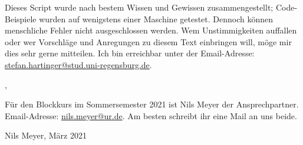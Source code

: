 Dieses Script wurde nach bestem Wissen und Gewissen zusammengestellt; Code-Beispiele wurden auf wenigstens einer Maschine getestet. Dennoch können menschliche Fehler nicht ausgeschlossen werden. Wem Unstimmigkeiten auffallen oder wer Vorschläge und Anregungen zu diesem Text einbringen will, möge mir dies sehr gerne mitteilen. Ich bin erreichbar unter der Email-Adresse:\\ \url{stefan.hartinger@stud.uni-regensburg.de}.
\begin{flushright}
\myName, \myVersionTime
\end{flushright}

Für den Blockkurs im Sommersemester 2021 ist Nils Meyer der Ansprechpartner. Email-Adresse: \url{nils.meyer@ur.de}. Am besten schreibt ihr eine Mail an uns beide.
\begin{flushright}
Nils Meyer, März 2021
\end{flushright}

\vfill

